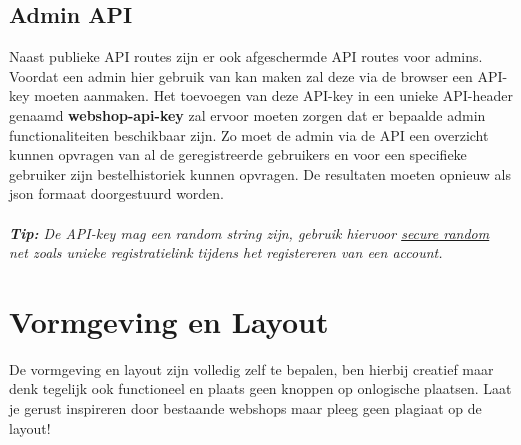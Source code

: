 \documentclass{article}
\begin{document}
\subsection{Admin API}
Naast publieke API routes zijn er ook afgeschermde API routes voor admins. Voordat een admin hier gebruik van kan maken zal deze via de browser een API-key moeten aanmaken. Het toevoegen van deze API-key in een unieke API-header genaamd \textbf{webshop-api-key} zal ervoor moeten zorgen dat er bepaalde admin functionaliteiten beschikbaar zijn. Zo moet de admin via de API een overzicht kunnen opvragen van al de geregistreerde gebruikers en voor een specifieke gebruiker zijn bestelhistoriek kunnen opvragen. De resultaten moeten opnieuw als json formaat doorgestuurd worden.
\\
\\
\textit{\textbf{Tip:} De API-key mag een random string zijn, gebruik hiervoor \href{https://hex.pm/packages/secure_random}{secure random} net zoals unieke registratielink tijdens het registereren van een account.}


\section{Vormgeving en Layout}
De vormgeving en layout zijn volledig zelf te bepalen, ben hierbij creatief maar denk tegelijk ook functioneel en plaats geen knoppen op onlogische plaatsen. Laat je gerust inspireren door bestaande webshops maar pleeg geen plagiaat op de layout! 
\end{document}
